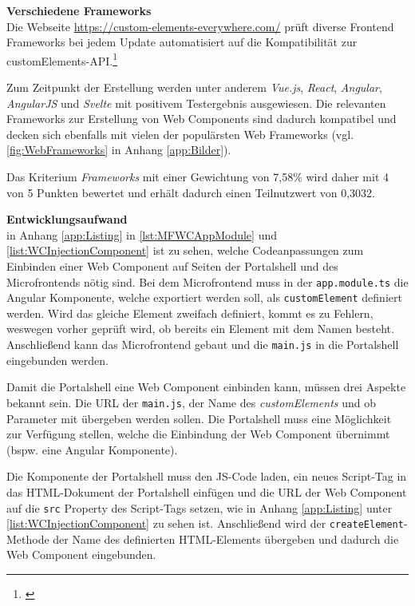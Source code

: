 \textbf{Verschiedene Frameworks}\\
Die Webseite \url{https://custom-elements-everywhere.com/} prüft diverse Frontend Frameworks bei jedem Update automatisiert auf die Kompatibilität zur customElements-API.\footnote{\cite[vgl.][]{CustomElementsEverywhere2022}}

Zum Zeitpunkt der Erstellung werden unter anderem \textit{Vue.js}, \textit{React}, \textit{Angular}, \textit{AngularJS} und \textit{Svelte} mit positivem Testergebnis ausgewiesen. Die relevanten Frameworks zur Erstellung von Web Components sind dadurch kompatibel und decken sich ebenfalls mit vielen der populärsten Web Frameworks (vgl. \cref{fig:WebFrameworks} in Anhang \ref{app:Bilder}).

Das Kriterium \textit{Frameworks} mit einer Gewichtung von 7,58\% wird daher mit 4 von 5 Punkten bewertet und erhält dadurch einen Teilnutzwert von 0,3032.

\textbf{Entwicklungsaufwand}\\
in Anhang \ref{app:Listing} in \cref{lst:MFWCAppModule} und \cref{list:WCInjectionComponent} ist zu sehen, welche Codeanpassungen zum Einbinden einer Web Component auf Seiten der Portalshell und des Microfrontends nötig sind.
Bei dem Microfrontend muss in der \texttt{app.module.ts} die Angular Komponente, welche exportiert werden soll, als \texttt{customElement} definiert werden. Wird das gleiche Element zweifach definiert, kommt es zu Fehlern, weswegen vorher geprüft wird, ob bereits ein Element mit dem Namen besteht. Anschließend kann das Microfrontend gebaut und die \texttt{main.js} in die Portalshell eingebunden werden.

Damit die Portalshell eine Web Component einbinden kann, müssen drei Aspekte bekannt sein. Die \gls{URL} der \texttt{main.js}, der Name des \textit{customElements} und ob Parameter mit übergeben werden sollen. Die Portalshell muss eine Möglichkeit zur Verfügung stellen, welche die Einbindung der Web Component übernimmt (bspw. eine Angular Komponente). 

Die Komponente der Portalshell muss den \gls{JS}-Code laden, ein neues Script-Tag in das HTML-Dokument der Portalshell einfügen und die \gls{URL} der Web Component auf die \texttt{src} Property des Script-Tags setzen, wie in Anhang \ref{app:Listing} unter \cref{list:WCInjectionComponent} zu sehen ist. Anschließend wird der \texttt{createElement}-Methode der Name des definierten HTML-Elements übergeben und dadurch die Web Component eingebunden.

